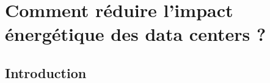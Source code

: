 \chapter{Comment réduire l'impact énergétique des data centers ?}
\vspace{3cm}
\minitoc
\clearpage
\label{Chapitre2}
\section{Introduction}
\begin{onehalfspace}



\end{onehalfspace}
